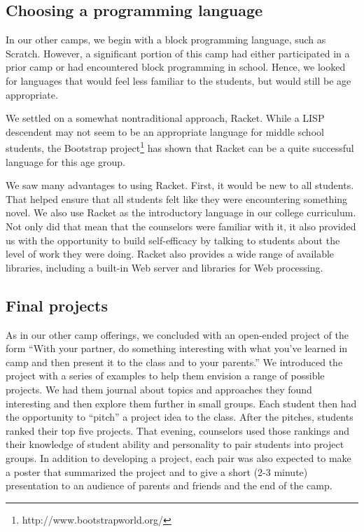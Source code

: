 \subsection{Choosing a programming language}

In our other camps, we begin with a block programming language,
such as Scratch.  However, a significant portion of this camp had
either participated in a prior camp or had encountered block
programming in school.  Hence, we looked for languages that would
feel less familiar to the students, but would still be age appropriate.

We settled on a somewhat nontraditional approach, Racket.  While a
LISP descendent may not seem to be an appropriate language for
middle school students, the Bootstrap
project\footnote{http://www.bootstrapworld.org/} has shown that
Racket can be a quite successful language for this age group.

We saw many advantages to using Racket.  First, it would be new to
all students.  That helped ensure that all students felt like they
were encountering something novel.  We also use Racket as the
introductory language in our college curriculum.  Not only did that
mean that the counselors were familiar with it, it also provided
us with the opportunity to build self-efficacy by talking to students
about the level of work they were doing.  Racket also provides a
wide range of available libraries, including a built-in Web server
and libraries for Web processing.  

\subsection{Final projects}

As in our other camp offerings, we concluded with an open-ended
project of the form ``With your partner, do something interesting
with what you've learned in camp and then present it to the class
and to your parents.'' We introduced the project with a series of
examples to help them envision a range of possible projects.  We
had them journal about topics and approaches they found interesting
and then explore them further in small groups.  Each student then
had the opportunity to ``pitch'' a project idea to the class.  After
the pitches, students ranked their top five projects.  That evening,
counselors used those rankings and their knowledge of student ability
and personality to pair students into project groups.
In addition to developing a project, each pair was also expected to make
a poster that summarized the project and to give a short (2-3 minute)
presentation to an audience of parents and friends and the end of the
camp.

